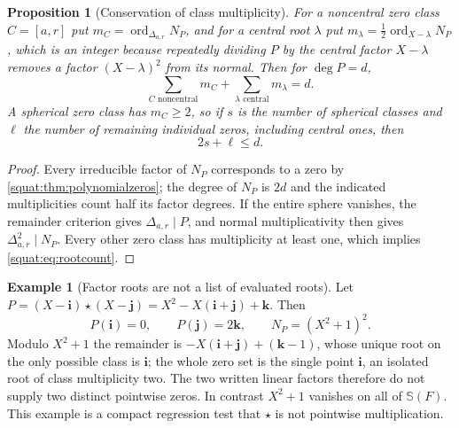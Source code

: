 \documentclass[11pt,letterpaper]{article}
\numberwithin{equation}{section}
\newtheorem{proposition}[proposition]{Proposition}
\theoremstyle{definition}
\newtheorem{example}[example]{Example}
\theoremstyle{remark}
\newcommand{\ii}{\mathbf i}
\newcommand{\jj}{\mathbf j}
\newcommand{\kk}{\mathbf k}
\newcommand{\ord}{\operatorname{ord}}
\begin{document}
\begin{proposition}[Conservation of class multiplicity]\label{squat:prop:rootcount}
For a noncentral zero class $C=[a,r]$ put $m_C=\ord_{\Delta_{a,r}}N_P$, and for a central
root $\lambda$ put $m_\lambda=\tfrac12\ord_{X-\lambda}N_P$, which is an integer because
repeatedly dividing $P$ by the central factor $X-\lambda$ removes a factor
$(X-\lambda)^2$ from its normal. Then for $\deg P=d$,
\[
 \sum_{C\text{ noncentral}}m_C+\sum_{\lambda\text{ central}}m_\lambda=d .
\]
A spherical zero class has $m_C\ge2$, so if $s$ is the number of spherical classes and
$\ell$ the number of remaining individual zeros, including central ones, then
\begin{equation}\label{squat:eq:rootcount}
 2s+\ell\le d .
\end{equation}
\end{proposition}
\begin{proof}
Every irreducible factor of $N_P$ corresponds to a zero by
\cref{squat:thm:polynomialzeros}; the degree of $N_P$ is $2d$ and the indicated
multiplicities count half its factor degrees. If the entire sphere vanishes, the remainder
criterion gives $\Delta_{a,r}\mid P$, and normal multiplicativity then gives
$\Delta_{a,r}^2\mid N_P$. Every other zero class has multiplicity at least one, which
implies \cref{squat:eq:rootcount}.
\end{proof}

\begin{example}[Factor roots are not a list of evaluated roots]\label{squat:ex:poly}
Let $P=(X-\ii)\star(X-\jj)=X^2-X(\ii+\jj)+\kk$. Then
\[
 P(\ii)=0,\qquad P(\jj)=2\kk,\qquad N_P=(X^2+1)^2 .
\]
Modulo $X^2+1$ the remainder is $-X(\ii+\jj)+(\kk-1)$, whose unique root on the only
possible class is $\ii$; the whole zero set is the single point $\ii$, an isolated root of
class multiplicity two. The two written linear factors therefore do not supply two
distinct pointwise zeros. In contrast $X^2+1$ vanishes on all of $\mathbb S(F)$. This
example is a compact regression test that $\star$ is not pointwise multiplication.
\end{example}
\end{document}

